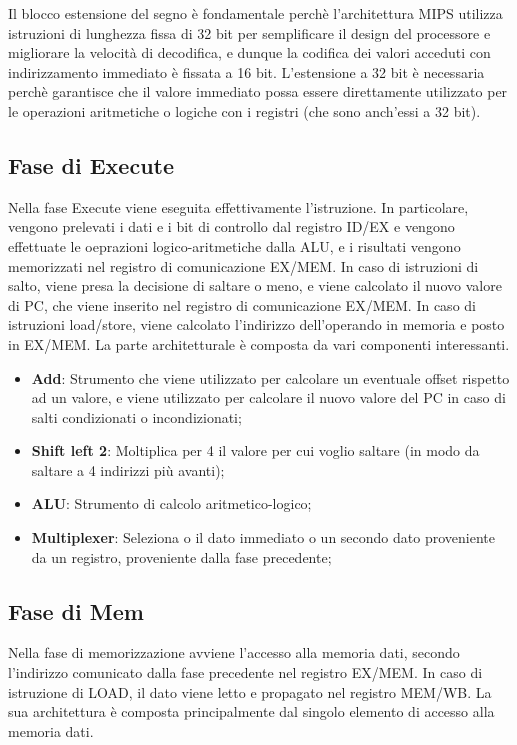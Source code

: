 Il blocco estensione del segno è fondamentale perchè l'architettura MIPS utilizza istruzioni di lunghezza fissa di 32 bit per semplificare il design del processore e migliorare la velocità di decodifica, e dunque la codifica dei valori acceduti con indirizzamento immediato è fissata a 16 bit. L'estensione a 32 bit è necessaria perchè garantisce che il valore immediato possa essere direttamente utilizzato per le operazioni aritmetiche o logiche con i registri (che sono anch'essi a 32 bit).

\subsection{Fase di Execute}
Nella fase Execute viene eseguita effettivamente l'istruzione. In particolare, vengono prelevati i dati e i bit di controllo dal registro ID/EX e vengono effettuate le oeprazioni logico-aritmetiche dalla ALU, e i risultati vengono memorizzati nel registro di comunicazione EX/MEM. In caso di istruzioni di salto, viene presa la decisione di saltare o meno, e viene calcolato il nuovo valore di PC, che viene inserito nel registro di comunicazione EX/MEM. In caso di istruzioni load/store, viene calcolato l'indirizzo dell'operando in memoria e posto in EX/MEM. 
La parte architetturale è composta da vari componenti interessanti.
\begin{itemize}
    \item \textbf{Add}: Strumento che viene utilizzato per calcolare un eventuale offset rispetto ad un valore, e viene utilizzato per calcolare il nuovo valore del PC in caso di salti condizionati o incondizionati;
    \item \textbf{Shift left 2}: Moltiplica per 4 il valore per cui voglio saltare (in modo da saltare a 4 indirizzi più avanti);
    \item \textbf{ALU}: Strumento di calcolo aritmetico-logico;
    \item \textbf{Multiplexer}: Seleziona o il dato immediato o un secondo dato proveniente da un registro, proveniente dalla fase precedente;
\end{itemize}

\subsection{Fase di Mem}
Nella fase di memorizzazione avviene l'accesso alla memoria dati, secondo l'indirizzo comunicato dalla fase precedente nel registro EX/MEM. In caso di istruzione di LOAD, il dato viene letto e propagato nel registro MEM/WB. 
La sua architettura è composta principalmente dal singolo elemento di accesso alla memoria dati.


